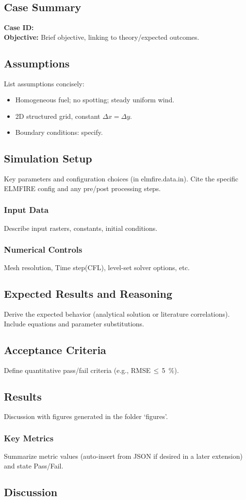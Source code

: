 \documentclass[../report/case_report.tex]{subfiles}
\begin{document}
\subsection*{Case Summary}
\textbf{Case ID:} \CaseID\\
\textbf{Objective:} Brief objective, linking to theory/expected outcomes.


\subsection{Assumptions}
List assumptions concisely:
\begin{itemize}[nosep]
\item Homogeneous fuel; no spotting; steady uniform wind.
\item 2D structured grid, constant \(\Delta x = \Delta y\).
\item Boundary conditions: specify.
\end{itemize}


\subsection{Simulation Setup}
Key parameters and configuration choices (in elmfire.data.in). Cite the specific ELMFIRE config and any pre/post processing steps.


\subsubsection{Input Data}
Describe input rasters, constants, initial conditions.


\subsubsection{Numerical Controls}
Mesh resolution, Time step(CFL), level-set solver options, etc.


\subsection{Expected Results and Reasoning}
Derive the expected behavior (analytical solution or literature correlations). Include equations and parameter substitutions.


\subsection{Acceptance Criteria}
Define quantitative pass/fail criteria (e.g., RMSE\,\(\leq\)\,\SI{5}{\percent}).


\subsection{Results}
Discussion with figures generated in the folder `figures'. 


\subsubsection{Key Metrics}
Summarize metric values (auto-insert from JSON if desired in a later extension) and state Pass/Fail.


\subsection{Discussion}
\end{document}
